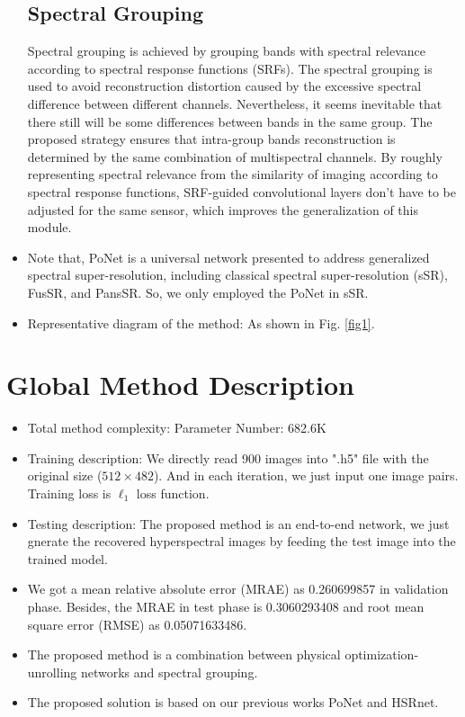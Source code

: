 \documentclass{article}
\begin{document}
\begin{itemize}
\subsection{Spectral Grouping}
\par{Spectral grouping is achieved by grouping bands with spectral relevance according to spectral response functions (SRFs). The spectral grouping is used to avoid reconstruction distortion caused by the excessive spectral difference between different channels. Nevertheless, it seems inevitable that there still will be some differences between bands in the same group. The proposed strategy ensures that intra-group bands reconstruction is determined by the same combination of multispectral channels. By roughly representing spectral relevance from the similarity of imaging according to spectral response functions, SRF-guided convolutional layers don't have to be adjusted for the same sensor, which improves the generalization of this module.
}
\item Note that, PoNet is a universal network presented to address generalized spectral super-resolution, including classical spectral super-resolution (sSR), FusSR, and PansSR. So, we only employed the PoNet in sSR.  
\item Representative diagram of the method: As shown in Fig. \ref{fig1}. 
            
\end{itemize}

\section{Global Method Description}

\begin{itemize}
\item Total method complexity: Parameter Number: 682.6K
\item Training description: We directly read 900 images into ".h5" file with the original size ($512\times482$). And in each iteration, we just input one image pairs. Training loss is $\ell_1$ loss function. 
\item Testing description: The proposed method is an end-to-end network, we just gnerate the recovered hyperspectral images by feeding the test image into the trained model.
\item We got a mean relative absolute error (MRAE) as 0.260699857 in validation phase. Besides, the MRAE in test phase is 0.3060293408 and root mean square error (RMSE) as 0.05071633486.
\item The proposed method is a combination between physical optimization-unrolling networks and spectral grouping. 
\item The proposed solution is based on our previous works PoNet \cite{ponet} and HSRnet\cite{hsrnet}.
\end{itemize}
\end{document}

